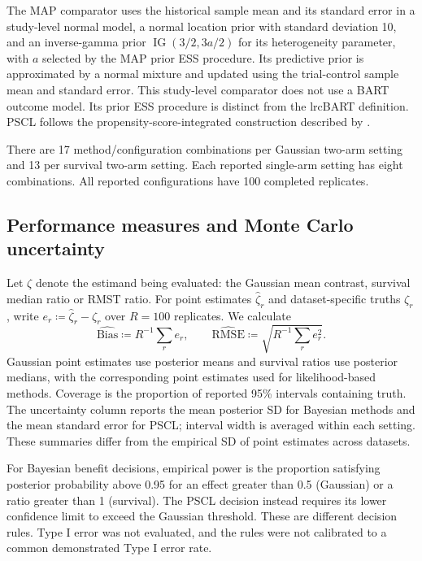 \documentclass[11pt]{article}
\newcommand{\IG}{\operatorname{IG}}
\theoremstyle{remark}\newtheorem{remark}{Remark}[section]
\providecommand{\DIFaddtex}[1]{{\protect\color{blue} \sf #1}} %
\providecommand{\DIFaddbegin}{} %
\providecommand{\DIFaddend}{} %
\providecommand{\DIFadd}[1]{\texorpdfstring{\DIFaddtex{#1}}{#1}} %
\begin{document}
The MAP comparator uses the historical sample mean and its standard error in a study-level normal model, a normal location prior with standard deviation 10, and an inverse-gamma prior $\IG(3/2,3a/2)$ for its heterogeneity parameter, with $a$ selected by the MAP prior ESS procedure. Its predictive prior is approximated by a normal mixture and updated using the trial-control sample mean and standard error. This study-level comparator does not use a BART outcome model. Its prior ESS procedure is distinct from the lrcBART definition. PSCL follows the propensity-score-integrated construction described by \citet{Chen2020PSCL}.

There are 17 method/configuration combinations per Gaussian two-arm setting and 13 per survival two-arm setting. Each reported single-arm setting has eight combinations. All reported configurations have 100 completed replicates.

\subsection{Performance measures and Monte Carlo uncertainty}\label{sec:E.5}
Let  \DIFaddbegin \DIFadd{$\zeta$ }\DIFaddend denote the estimand being evaluated: the Gaussian mean contrast, survival median ratio or RMST ratio. For point estimates  \DIFaddbegin \DIFadd{$\widehat\zeta_r$ }\DIFaddend and dataset-specific truths  \DIFaddbegin \DIFadd{$\zeta_r$, write $e_r\coloneqq \widehat\zeta_r-\zeta_r$ }\DIFaddend over $R=100$ replicates. We calculate
\begin{equation}
\widehat{\mathrm{Bias}}\coloneqq R^{-1}\sum_r e_r,\qquad
\widehat{\mathrm{RMSE}}\coloneqq \sqrt{R^{-1}\sum_r e_r^2}.
\end{equation}
Gaussian point estimates use posterior means and survival ratios use posterior medians, with the corresponding point estimates used for likelihood-based methods. Coverage is the proportion of reported 95\% intervals containing truth. The uncertainty column reports the mean posterior SD for Bayesian methods and the mean standard error for PSCL; interval width is averaged within each setting. These summaries differ from the empirical SD of point estimates across datasets.

For Bayesian benefit decisions, empirical power is the proportion satisfying posterior probability above 0.95 for an effect greater than 0.5 (Gaussian) or a ratio greater than 1 (survival). The PSCL decision instead requires its lower confidence limit to exceed the Gaussian threshold. These are different decision rules. Type I error was not evaluated, and the rules were not calibrated to a common demonstrated Type I error rate.
\end{document}
